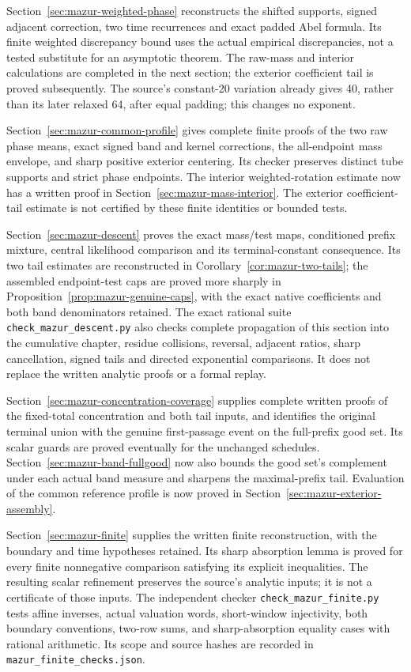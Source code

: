 \documentclass[11pt]{article}
\theoremstyle{remark}\newtheorem{remark}[proposition]{Remark}
\begin{document}
Section~\ref{sec:mazur-weighted-phase} reconstructs the shifted supports,
signed adjacent correction, two time recurrences and exact padded Abel
formula. Its finite weighted discrepancy bound uses the actual empirical
discrepancies, not a tested substitute for an asymptotic theorem.
The raw-mass and interior calculations are completed in the next
section; the exterior coefficient tail is proved subsequently. The source's constant-20
variation already gives 40, rather than its later relaxed 64, after
equal padding; this changes no exponent.

Section~\ref{sec:mazur-common-profile} gives complete finite proofs of
the two raw phase means, exact signed band and kernel corrections,
the all-endpoint mass envelope, and sharp positive exterior centering.
Its checker preserves distinct tube supports and strict phase endpoints.
The interior weighted-rotation estimate now has a written proof in
Section~\ref{sec:mazur-mass-interior}. The exterior coefficient-tail
estimate is not certified by these finite identities or bounded tests.

Section~\ref{sec:mazur-descent} proves the exact mass/test maps,
conditioned prefix mixture, central likelihood comparison and its
terminal-constant consequence. Its two tail estimates are reconstructed
in Corollary~\ref{cor:mazur-two-tails}; the assembled endpoint-test caps
are proved more sharply in Proposition~\ref{prop:mazur-genuine-caps},
with the exact native coefficients and both band denominators retained.
The exact rational suite \texttt{check\_mazur\_descent.py} also checks
complete propagation of this section into the cumulative chapter,
residue collisions, reversal, adjacent ratios, sharp cancellation,
signed tails and directed exponential comparisons. It does not
replace the written analytic proofs or a formal replay.

Section~\ref{sec:mazur-concentration-coverage} supplies complete written
proofs of the fixed-total concentration and both tail inputs, and
identifies the original terminal union with the genuine first-passage
event on the full-prefix good set. Its scalar guards are proved eventually
for the unchanged schedules. Section~\ref{sec:mazur-band-fullgood} now
also bounds the good set's complement under each actual band measure and
sharpens the maximal-prefix tail. Evaluation of the common reference
profile is now proved in Section~\ref{sec:mazur-exterior-assembly}.

Section~\ref{sec:mazur-finite} supplies the written finite reconstruction,
with the boundary and time hypotheses retained. Its sharp absorption lemma
is proved for every finite nonnegative comparison satisfying its explicit
inequalities. The resulting scalar refinement preserves the source's
analytic inputs; it is not a certificate of those inputs. The independent
checker \texttt{check\_mazur\_finite.py} tests affine inverses, actual
valuation words, short-window injectivity, both boundary conventions,
two-row sums, and sharp-absorption equality cases with rational arithmetic.
Its scope and source hashes are recorded in \texttt{mazur\_finite\_checks.json}.
\end{document}

